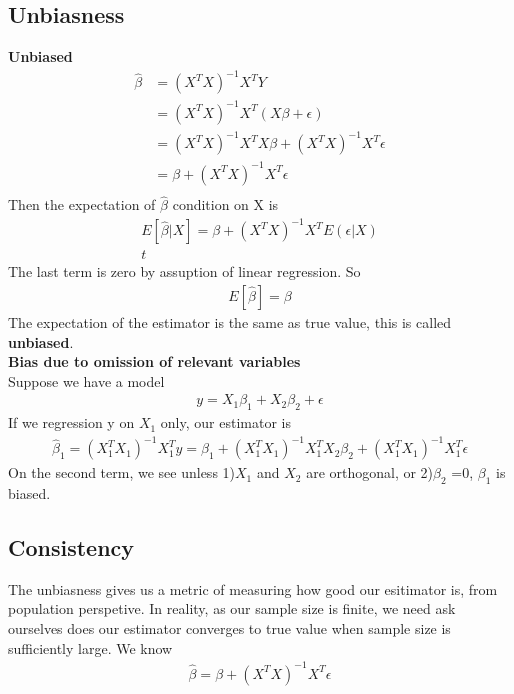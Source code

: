 \documentclass[a4paper]{article}
\begin{document}
\subsection{Unbiasness}
{\bf Unbiased}\\
\begin{align*}
\hat \beta & = (X^T X)^{-1}X^TY\\
               & = (X^T X)^{-1}X^T(X \beta + \epsilon)\\
               & = (X^T X)^{-1}X^T X \beta   + (X^T X)^{-1}X^T \epsilon\\
               & = \beta +  (X^T X)^{-1}X^T \epsilon\\
\end{align*}
Then the expectation of $\hat \beta$ condition on X is
\begin{align*}
E[{\hat \beta|X}] = \beta + (X^TX)^{-1} X^T E(\epsilon|X)\\t
\end{align*}
The last term is zero by assuption of linear regression. So 
\begin{align*}
E[\hat \beta] = \beta
\end{align*}
The expectation of the estimator is the same as true value, this is called {\bf unbiased}. \\
{\bf Bias due to omission of relevant variables}\\
Suppose we have a model
\begin{align*}
y = X_1 \beta_1 + X_2 \beta_2 + \epsilon
\end{align*}
If we regression y on $X_1$ only, our estimator is
\begin{align*}
\hat \beta_1 = (X_1^T X_1)^{-1} X_1^T y = \beta_1 + (X_1^TX_1)^{-1}X_1^TX_2\beta_2 + (X_1^TX_1)^{-1}X_1^T\epsilon
\end{align*}
On the second term, we see unless 1)$X_1$ and $X_2$ are orthogonal, or 2)$\beta_2$ =0,  $\beta_1$ is biased.\\
\subsection{Consistency}
The unbiasness gives us a metric of measuring how good our esitimator is, from population perspetive. In reality, as our sample size is finite, we need ask ourselves does our estimator converges to true value when sample size is sufficiently large. We know
\begin{align*}
\hat \beta = \beta + (X^TX)^{-1}X^T\epsilon
\end{align*}
\end{document}
